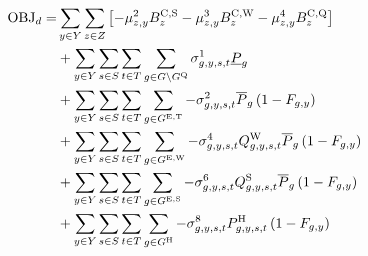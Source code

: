 \documentclass{article}
\begin{document}
\begin{align}
\textrm{OBJ}_{d} =  & \sum\limits_{\iYear \in \sYears} \sum\limits_{\iZone \in \sZones} \left[- \dSolarBuildLimit \cBuildLimitSolar - \dWindBuildLimit \cBuildLimitWind 
- \dStorageBuildLimit \cBuildLimitStorage
\right]\\
& + \sum\limits_{\iYear \in \sYears}\sum\limits_{\iScenario \in \sScenarios}\sum\limits_{\iInterval \in \sIntervals} \sum\limits_{\iGenerator \in \sGenerators \setminus \sStorage} \dMinPowerOutput \cPowerOutputMin\\
& + \sum\limits_{\iYear \in \sYears}\sum\limits_{\iScenario \in \sScenarios}\sum\limits_{\iInterval \in \sIntervals} \sum\limits_{\iGenerator \in \sGeneratorsExistingThermal} - \dMaxPowerOutputExistingThermal \cPowerOutputMax[\iGenerator] \left(1 - \cRetirementIndicator\right)\\
& + \sum\limits_{\iYear \in \sYears}\sum\limits_{\iScenario \in \sScenarios}\sum\limits_{\iInterval \in \sIntervals} \sum\limits_{\iGenerator \in \sGeneratorsExistingWind} - \dMaxPowerOutputWindExisting \cCapacityFactorWind \cPowerOutputMax[\iGenerator] \left(1 - \cRetirementIndicator\right)\\
& + \sum\limits_{\iYear \in \sYears}\sum\limits_{\iScenario \in \sScenarios}\sum\limits_{\iInterval \in \sIntervals} \sum\limits_{\iGenerator \in \sGeneratorsExistingSolar} - \dMaxPowerOutputSolarExisting \cCapacityFactorSolar \cPowerOutputMax[\iGenerator] \left(1 - \cRetirementIndicator\right)\\
& + \sum\limits_{\iYear \in \sYears}\sum\limits_{\iScenario \in \sScenarios}\sum\limits_{\iInterval \in \sIntervals} \sum\limits_{\iGenerator \in \sGeneratorsHydro} - \dMaxPowerOutputHydro \cPowerOutputHydro \left(1 - \cRetirementIndicator\right)\\

\end{align}
\end{document}
